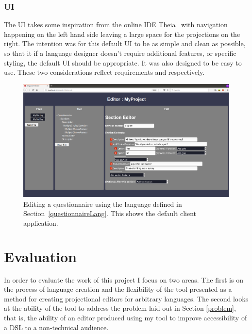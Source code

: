 \documentclass{article}
\begin{document}
{\subsubsection{UI}
The UI takes some inspiration from the online IDE Theia~\cite{theia} with navigation happening on the left hand side leaving a large space for the projections on the right. The intention was for this default UI to be as simple and clean as possible, so that it if a language designer doesn't require additional features, or specific styling, the default UI should be appropriate. It was also designed to be easy to use. These two considerations reflect requirements \RSetup and \RIntuitive respectively.
\begin{figure}[h!]
  \centering
  \includegraphics[width=\linewidth]{./Screenshots/questionnaireUI2.png}
  \caption{Editing a questionnaire using the language defined in Section~\ref{questionnaireLang}. This shows the default client application.}
  \label{fig:webUI}
\end{figure}
%
%
\section{Evaluation}\label{evaluation}
In order to evaluate the work of this project I focus on two areas. The first is on the process of language creation and the flexibility of the tool presented as a method for creating projectional editors for arbitrary languages. The second looks at the ability of the tool to address the problem laid out in Section \ref{problem}, that is, the ability of an editor produced using my tool to improve accessibility of a DSL to a non-technical audience.
}
\end{document}
